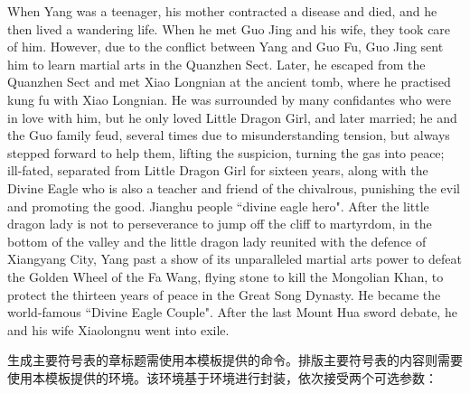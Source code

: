 \documentclass[print, promaster, vlined]{DissertUESTC}
\begin{document}
	
	
	\enabstract
	
	When Yang was a teenager, his mother contracted a disease and died, and he then lived a wandering life. When he met Guo Jing and his wife, they took care of him. However, due to the conflict between Yang and Guo Fu, Guo Jing sent him to learn martial arts in the Quanzhen Sect. Later, he escaped from the Quanzhen Sect and met Xiao Longnian at the ancient tomb, where he practised kung fu with Xiao Longnian. He was surrounded by many confidantes who were in love with him, but he only loved Little Dragon Girl, and later married; he and the Guo family feud, several times due to misunderstanding tension, but always stepped forward to help them, lifting the suspicion, turning the gas into peace; ill-fated, separated from Little Dragon Girl for sixteen years, along with the Divine Eagle who is also a teacher and friend of the chivalrous, punishing the evil and promoting the good. Jianghu people ``divine eagle hero". After the little dragon lady is not to perseverance to jump off the cliff to martyrdom, in the bottom of the valley and the little dragon lady reunited with the defence of Xiangyang City, Yang past a show of its unparalleled martial arts power to defeat the Golden Wheel of the Fa Wang, flying stone to kill the Mongolian Khan, to protect the thirteen years of peace in the Great Song Dynasty. He became the world-famous ``Divine Eagle Couple". After the last Mount Hua sword debate, he and his wife Xiaolongnu went into exile.
	
	
	
	\tableofcontents  %
	
	\listoffigures  %
	
	\listoftables  %
	
	\listofsymbs  %
	
	生成主要符号表的章标题需使用本模板提供的命令。排版主要符号表的内容则需要使用本模板提供的环境。该环境基于环境进行封装，依次接受两个可选参数：
	
	
\end{document}

